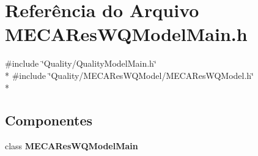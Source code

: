 \section{Referência do Arquivo M\+E\+C\+A\+Res\+W\+Q\+Model\+Main.\+h}
\label{_m_e_c_a_res_w_q_model_main_8h}
{\ttfamily \#include \char`\"{}Quality/\+Quality\+Model\+Main.\+h\char`\"{}}\\*
{\ttfamily \#include \char`\"{}Quality/\+M\+E\+C\+A\+Res\+W\+Q\+Model/\+M\+E\+C\+A\+Res\+W\+Q\+Model.\+h\char`\"{}}\\*
\subsection*{Componentes}
\begin{DoxyCompactItemize}
\item 
class {\bf M\+E\+C\+A\+Res\+W\+Q\+Model\+Main}
\end{DoxyCompactItemize}
